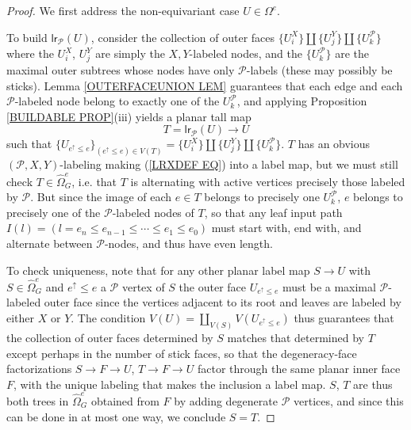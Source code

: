 \documentclass[a4paper,10pt]{article}%
\begin{document}
\begin{proof}
	We first address the non-equivariant case $U \in \Omega^e$.

	To build $\mathsf{lr}_{\mathcal{P}}(U)$, consider the collection of outer faces
	$\{U_i^X\} \amalg \{U_j^Y\} \amalg \{U_k^{\mathcal{P}}\}$
where the $U_i^X$, $U_j^Y$ are simply the $X,Y$-labeled nodes,
and the $\{U_k^{\mathcal{P}}\}$ are the maximal outer subtrees whose nodes have only $\mathcal{P}$-labels (these may possibly be sticks). 
Lemma \ref{OUTERFACEUNION LEM} guarantees that 
each edge and each $\mathcal{P}$-labeled node belong to exactly
one of the $U_k^{\mathcal{P}}$, and applying 
Proposition \ref{BUILDABLE PROP}(iii)
yields a planar tall map
\begin{equation}\label{LRXDEF EQ}
T = \mathsf{lr}_{\mathcal{P}}(U) \to U
\end{equation}
such that $\{U_{e^{\uparrow} \leq e}\}_{(e^{\uparrow} \leq e) \in V(T)}
 = \{U_i^X\} \amalg \{U_j^Y\} \amalg 
 \{U_k^{\mathcal{P}}\}$. 
 $T$ has an obvious $(\mathcal{P},X,Y)$-labeling making 
(\ref{LRXDEF EQ}) into a label map, but we must still check $T \in \widehat{\Omega}^{e}_G$, i.e. that 
$T$ is alternating with active vertices precisely those labeled by $\mathcal{P}$.
But since the image of each $e \in T$
belongs to precisely one $U_k^{\mathcal{P}}$,
$e$ belongs to precisely one of the $\mathcal{P}$-labeled nodes of $T$, so that any leaf input path
$I(l) = (l = e_n \leq e_{n-1} \leq \cdots \leq e_1 \leq e_0)$
must start with, end with, and alternate between 
$\mathcal{P}$-nodes, and thus have even length.

To check uniqueness, note that for any other planar label map $S \to U$ with $S \in \widehat{\Omega}_G^e$
and $e^{\uparrow} \leq e$ a $\mathcal{P}$ vertex of $S$
the outer face 
$U_{e^{\uparrow} \leq e}$
must be a maximal 
$\mathcal{P}$-labeled outer face since the vertices adjacent to its root and leaves are labeled by either $X$ or $Y$.
The condition 
$V(U) = \coprod_{V(S)} V(U_{e^{\uparrow} \leq e})$
thus guarantees that the collection of outer faces determined by $S$ matches that determined by $T$
except perhaps in the number of stick faces, so that 
the degeneracy-face factorizations
$S \to F \to U$, $T \to F \to U$
factor through the same planar inner face $F$, with the  unique labeling that makes the inclusion a label map.
$S$, $T$ are thus both trees in $\widehat{\Omega}_G^e$ obtained from $F$ by adding degenerate $\mathcal{P}$ vertices, 
and since this can be done in at most one way, we conclude 
$S=T$. 


\end{proof}
\end{document}
